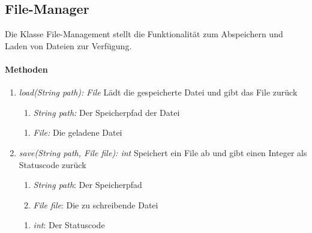 \subsection*{File-Manager}\label{fileman}
Die Klasse File-Management stellt die Funktionalität zum Abspeichern und Laden von Dateien zur Verfügung.

\paragraph{Methoden}

\begin{enumerate}[+]
	\item \textit{load(String path): File} Lädt die gespeicherte Datei und gibt das File zurück
	\begin{enumerate}[$\bullet$]
	\item \textit{String path:} Der Speicherpfad der Datei
	\end{enumerate}
	\begin{enumerate}[$\circ$]
		\item \textit{File:} Die geladene Datei
	\end{enumerate}

	\item \textit{save(String path, File file): int} Speichert ein File ab und gibt einen Integer als Statuscode zurück
	\begin{enumerate}[$\bullet$]
		\item \textit{String path}: Der Speicherpfad
		\item \textit{File file}: Die zu schreibende Datei
	\end{enumerate}
	\begin{enumerate}[$\circ$]
	\item \textit{int}: Der Statuscode
	\end{enumerate}
\end{enumerate}